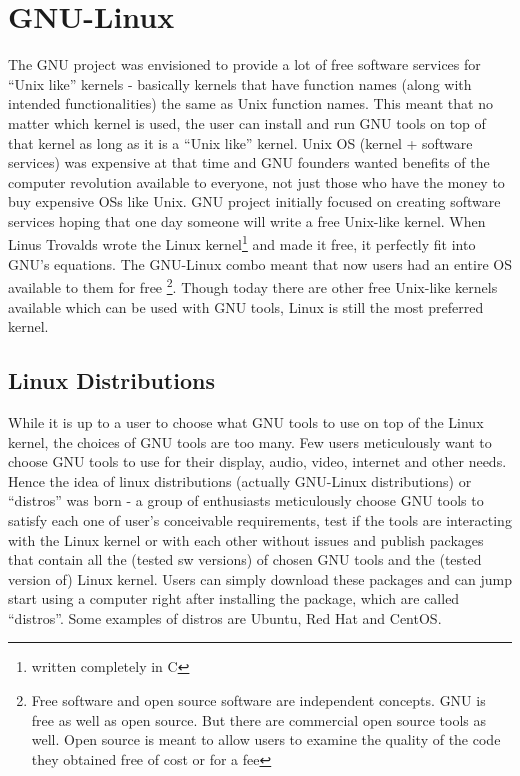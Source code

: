 \chapter{GNU-Linux}
The GNU project was envisioned to provide a lot of free software services for ``Unix like'' kernels - basically kernels that have function names (along with intended functionalities) the same as Unix function names. This meant that no matter which kernel is used, the user can install and run GNU tools on top of that kernel as long as it is a ``Unix like'' kernel. Unix OS (kernel + software services) was expensive at that time and GNU founders wanted benefits of the computer revolution available to everyone, not just those who have the money to buy expensive OSs like Unix. GNU project initially focused on creating software services hoping that one day someone will write a free Unix-like kernel. When Linus Trovalds wrote the Linux kernel\footnote{written completely in C} and made it free, it perfectly fit into GNU's equations. The GNU-Linux combo meant that now users had an entire OS available to them for free \footnote{Free software and open source software are independent concepts. GNU is free as well as open source. But there are commercial open source tools as well. Open source is meant to allow users to examine the quality of the code they obtained free of cost or for a fee}. Though today there are other free Unix-like kernels available which can be used with GNU tools, Linux is still the most preferred kernel. 

\section{Linux Distributions}
While it is up to a user to choose what GNU tools to use on top of the Linux kernel, the choices of GNU tools are too many. Few users meticulously want to choose GNU tools to use for their display, audio, video, internet and other needs. Hence the idea of linux distributions (actually GNU-Linux distributions)  or ``distros'' was born - a group of enthusiasts meticulously choose GNU tools to satisfy each one of user's conceivable requirements, test if the tools are interacting with the Linux kernel or with each other without issues and publish packages that contain all the (tested sw versions) of chosen GNU tools and the (tested version of) Linux kernel. Users can simply download these packages and can jump start using a computer right after installing the package, which are called ``distros''. Some examples of distros are Ubuntu, Red Hat and CentOS.

